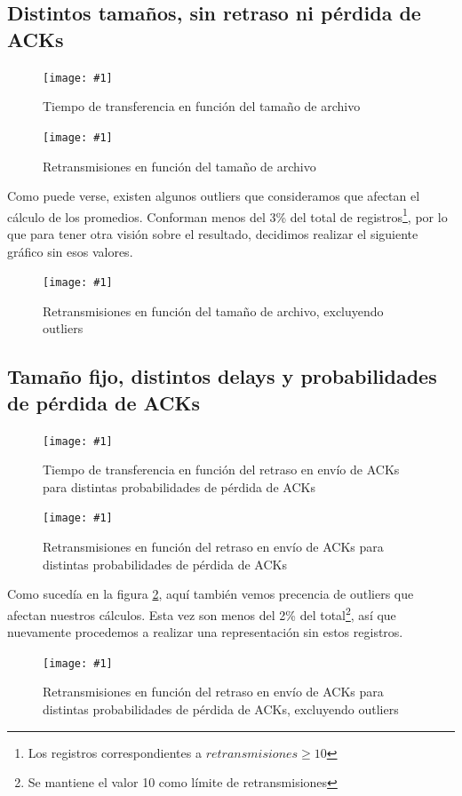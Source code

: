 \documentclass[a4paper, 10pt, twoside]{article}
\newcommand{\grafico}[3]{
  \begin{figure}[H]
    \texttt{[image: \#1]}
    \caption{#2}
    \label{#3}
  \end{figure}
}
\begin{document}
\subsection{Distintos tamaños, sin retraso ni pérdida de ACKs}

\grafico{time_vs_size}
        {Tiempo de transferencia en función del tamaño de archivo}
        {plot:time_vs_size}

\grafico{retransmissions_vs_size}
        {Retransmisiones en función del tamaño de archivo}
        {plot:retransmissions_vs_size}

Como puede verse, existen algunos outliers que consideramos que afectan el cálculo de los promedios. Conforman menos del 3\% del total de registros\footnote{Los registros correspondientes a $retransmisiones \ge 10$}, por lo que para tener otra visión sobre el resultado, decidimos realizar el siguiente gráfico sin esos valores.

\grafico{retransmissions_vs_size_wo_outliers}
        {Retransmisiones en función del tamaño de archivo, excluyendo outliers}
        {plot:retransmissions_vs_size_wo_outliers}


\subsection{Tamaño fijo, distintos delays y probabilidades de pérdida de ACKs}

\grafico{time_vs_delay_and_loss_probability}
        {Tiempo de transferencia en función del retraso en envío de ACKs para distintas probabilidades de pérdida de ACKs}
        {plot:time_vs_delay_and_loss_probability}

\grafico{retransmissions_vs_delay_and_loss_probability}
        {Retransmisiones en función del retraso en envío de ACKs para distintas probabilidades de pérdida de ACKs}
        {plot:retransmissions_vs_delay_and_loss_probability}

Como sucedía en la figura \ref{plot:retransmissions_vs_size}, aquí también vemos precencia de outliers que afectan nuestros cálculos. Esta vez son menos del 2\% del total\footnote{Se mantiene el valor 10 como límite de retransmisiones}, así que nuevamente procedemos a realizar una representación sin estos registros.

\grafico{retransmissions_vs_delay_and_loss_probability_wo_outliers}
        {Retransmisiones en función del retraso en envío de ACKs para distintas probabilidades de pérdida de ACKs, excluyendo outliers}
        {plot:retransmissions_vs_delay_and_loss_probability_wo_outliers}
\end{document}

